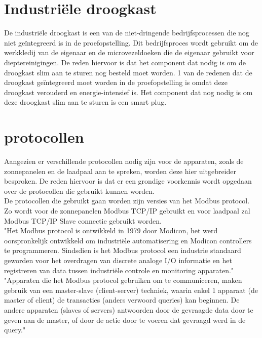 \section{Industriële droogkast}
\label{sec:stand-van-zaken-droogkast}

De industriële droogkast is een van de niet-dringende bedrijfsprocessen die nog niet geïntegreerd is in de proefopstelling. Dit bedrijfsproces wordt gebruikt om de werkkledij van de eigenaar en de microvezeldoeken die de eigenaar gebruikt voor dieptereinigingen. De reden hiervoor is dat het component dat nodig is om de droogkast slim aan te sturen nog besteld moet worden. 1 van de redenen dat de droogkast geïntegreerd moet worden in de proefopstelling is omdat deze droogkast verouderd en energie-intensief is. Het component dat nog nodig is om deze droogkast slim aan te sturen is een smart plug.

\section{protocollen}
\label{sec:stand-van-zaken-protocollen}

Aangezien er verschillende protocollen nodig zijn voor de apparaten, zoals de zonnepanelen en de laadpaal aan te spreken, worden deze hier uitgebreider besproken. De reden hiervoor is dat er een grondige voorkennis wordt opgedaan over de protocollen die gebruikt kunnen worden.\\

De protocollen die gebruikt gaan worden zijn versies van het Modbus protocol. Zo wordt voor de zonnepanelen Modbus TCP/IP gebruikt en voor laadpaal zal Modbus TCP/IP Slave connectie gebruikt worden.\\

"Het Modbus protocol is ontwikkeld in 1979 door Modicon, het werd oorspronkelijk ontwikkeld om industriële automatisering en Modicon controllers te programmeren. Sindsdien is het Modbus protocol een industrie standaard geworden voor het overdragen van discrete analoge I/O informatie en het registreren van data tussen industriële controle en monitoring apparaten." \autocite{Acromag2005} \\

"Apparaten die het Modbus protocol gebruiken om te communiceren, maken gebruik van een master-slave (client-server) techniek, waarin enkel 1 apparaat (de master of client) de transacties (anders verwoord queries) kan beginnen. De andere apparaten (slaves of servers) antwoorden door de gevraagde data door te geven aan de master, of door de actie door te voeren dat gevraagd werd in de query." \autocite{Acromag2005} \\

